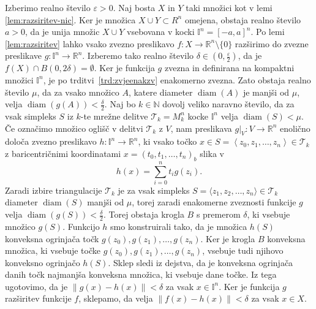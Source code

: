 \documentclass[mat1]{fmfdelo}
\newcommand{\R}{\mathbb R}
\newcommand{\N}{\mathbb N}
\DeclareMathOperator{\diam}{diam}
\newcommand{\I}{\mathbb I}
\newcommand{\0}{0}
\newcommand{\pT}{\mathcal T}
\begin{document}
\begin{dokaz}
Izberimo realno število $\varepsilon > 0$. Naj bosta $X$ in $Y$ taki množici kot v lemi \ref{lem:razsiritev-nic}. Ker je množica $X \cup Y \subset R^n$ omejena, obstaja realno število $a > 0$, da je unija množic $X \cup Y$ vsebovana v kocki $\I^n = \left [ -a, a \right ]^n$. Po lemi \ref{lem:razsiritev} lahko vsako zvezno preslikavo $f : X \to \R^n \setminus \{ \0 \}$ razširimo do zvezne preslikave $g : \I^n \to \R^n$. Izberemo tako realno število $\delta \in (0, \frac{\varepsilon}{2})$, da je $f(X) \cap B( \0, 2\delta) = \emptyset$. Ker je funkcija $g$ zvezna in definirana na kompaktni množici $\I^n$, je po trditvi~\ref{trd:zvjeenakzv} enakomerno zvezna. Zato obstaja realno število $\mu$, da za vsako množico $A$, katere diameter $\diam(A)$ je manjši od $\mu$, velja $\diam(g(A)) < \frac{\delta}{2}$. Naj bo $k \in \N$ dovolj veliko naravno število, da za vsak simpleks $S$ iz $k$-te mrežne delitve $\pT_k = M_k^n$ kocke $\I^n$ velja $\diam(S) < \mu$. Če označimo množico oglišč v delitvi $\pT_k$ z $V$, nam preslikava $g|_V : V \to \R^n$ enolično določa zvezno preslikavo $h : \I^n \to \R^n$, ki vsako točko $x \in S = \left < z_0, z_1, \dots, z_n \right > \in \pT_k$ z baricentričnimi koordinatami $x = (t_0, t_1, \dots, t_n)_b$ slika v 
$$h(x) = \sum_{i=0}^n t_i g(z_i).$$
Zaradi izbire triangulacije $\pT_k$ je za vsak simpleks $S = \langle  z_1, z_2, \dots, z_n \rangle \in \pT_k$ diameter $\diam(S)$ manjši od $\mu$, torej zaradi enakomerne zveznosti funkcije $g$ velja $\diam (g(S)) < \frac{\delta}{2}$. Torej obstaja krogla $B$ s premerom $\delta$, ki vsebuje množico $g(S)$. Funkcijo $h$ smo konstruirali tako, da je množica $h(S)$ konveksna ogrinjača točk $g(z_0), g(z_1), \dots, g(z_n)$. Ker je krogla $B$ konveksna množica, ki vsebuje točke $g(z_0), g(z_1), \dots, g(z_n)$, vsebuje tudi njihovo konveksno ogrinjačo $h(S)$. Sklep sledi iz dejstva, da je konveksna ogrinjača danih točk najmanjša konveksna množica, ki vsebuje dane točke. Iz tega ugotovimo, da je $\| g(x) - h(x) \| < \delta$ za vsak $x \in \I^n$. Ker je funkcija $g$ razširitev funkcije $f$, sklepamo, da velja $\| f(x) - h(x) \| < \delta$ za vsak $x \in X$.


\end{dokaz}
\end{document}
